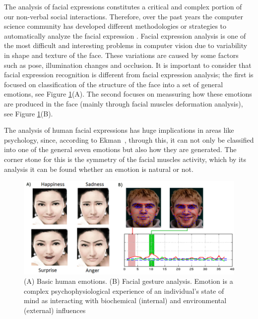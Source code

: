 The analysis of facial expressions constitutes a critical and complex portion of our non-verbal social interactions. Therefore, over the past years the computer science community has developed different methodologies or strategies to automatically analyze the facial expression \cite{Fasel01}. %
Facial expression analysis is one of the most difficult and interesting problems in computer vision due to variability in shape and texture of the face. These variations are caused by some factors such as pose, illumination changes and occlusion. It is important to consider that facial expression recognition is different from facial expression analysis; the first is focused on classification of the structure of the face into a set of general emotions, see Figure \ref{fig:BasicEmotions}(A). The second focuses on meassuring how these emotions are produced in the face (mainly through facial muscles deformation analysis), see Figure \ref{fig:BasicEmotions}(B).

The analysis of human facial expressions has huge implications in areas like psychology, since, according to Ekman~\cite{Hager1979}, through this, it can not only be classified into one of the general seven emotions but also how they are generated. The corner stone for this is the symmetry of the facial muscles activity, which by its analysis it can be found whether an emotion is natural or not.

\begin{figure}[h]
    \centering
    \includegraphics[scale=0.4]{images/emotionsAndGraphics1.png}
    \caption[Basic human emotions and Facial gesture analysis]{(A) Basic human emotions. (B) Facial gesture analysis. Emotion is a complex psychophysiological experience of an individual's state of mind as interacting with biochemical (internal) and environmental (external) influences}
    \label{fig:BasicEmotions}
\end{figure}

